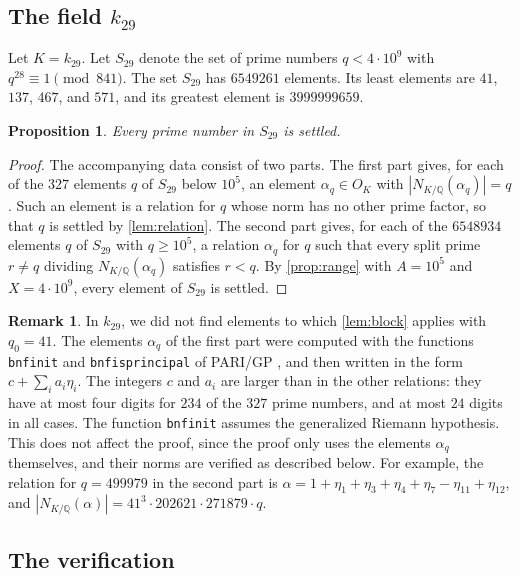 \documentclass[11pt]{amsart}
\theoremstyle{plain}
\newtheorem{proposition}[theorem]{Proposition}
\theoremstyle{definition}
\newtheorem{remark}[theorem]{Remark}
\begin{document}
\subsection{The field $k_{29}$}

Let $K = k_{29}$.
Let $S_{29}$ denote the set of prime numbers $q < 4 \cdot 10^9$ with $q^{28} \equiv 1 \pmod{841}$.
The set $S_{29}$ has $6549261$ elements.
Its least elements are $41$, $137$, $467$, and $571$, and its greatest element is $3999999659$.

\begin{proposition} \label{prop:data29}
Every prime number in $S_{29}$ is settled.
\end{proposition}

\begin{proof}
The accompanying data consist of two parts.
The first part gives, for each of the $327$ elements $q$ of $S_{29}$ below $10^5$, an element $\alpha_q \in O_K$ with $|N_{K/\mathbb{Q}}(\alpha_q)| = q$.
Such an element is a relation for $q$ whose norm has no other prime factor, so that $q$ is settled by \cref{lem:relation}.
The second part gives, for each of the $6548934$ elements $q$ of $S_{29}$ with $q \ge 10^5$, a relation $\alpha_q$ for $q$ such that every split prime $r \ne q$ dividing $N_{K/\mathbb{Q}}(\alpha_q)$ satisfies $r < q$.
By \cref{prop:range} with $A = 10^5$ and $X = 4 \cdot 10^9$, every element of $S_{29}$ is settled.
\end{proof}

\begin{remark} \label{rem:41}
In $k_{29}$, we did not find elements to which \cref{lem:block} applies with $q_0 = 41$.
The elements $\alpha_q$ of the first part were computed with the functions \texttt{bnfinit} and \texttt{bnfisprincipal} of PARI/GP \cite{PARI}, and then written in the form $c + \sum_i a_i \eta_i$.
The integers $c$ and $a_i$ are larger than in the other relations: they have at most four digits for $234$ of the $327$ prime numbers, and at most $24$ digits in all cases.
The function \texttt{bnfinit} assumes the generalized Riemann hypothesis.
This does not affect the proof, since the proof only uses the elements $\alpha_q$ themselves, and their norms are verified as described below.
For example, the relation for $q = 499979$ in the second part is $\alpha = 1 + \eta_1 + \eta_3 + \eta_4 + \eta_7 - \eta_{11} + \eta_{12}$, and $|N_{K/\mathbb{Q}}(\alpha)| = 41^3 \cdot 202621 \cdot 271879 \cdot q$.
\end{remark}

\subsection{The verification} \label{subsec:verification}
\end{document}
